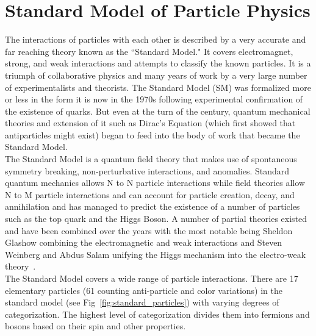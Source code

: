 	\section{Standard Model of Particle Physics}
	The interactions of particles with each other is described by a very accurate and far reaching theory known as the ``Standard Model." It covers electromagnet, strong, and weak  interactions and attempts to classify the known particles. It is a triumph of collaborative physics and many years of work by a very large number of experimentalists and theorists. The Standard Model (SM) was formalized more or less in the form it is now in the 1970s following experimental confirmation of the existence of quarks. But even at the turn of the century, quantum mechanical theories and extension of it such as Dirac's Equation (which first showed that antiparticles might exist) began to feed into the body of work that became the Standard Model.\\
	
	The Standard Model is a quantum field theory that makes use of spontaneous symmetry breaking, non-perturbative interactions, and anomalies.  Standard quantum mechanics allows N to N particle interactions while field theories allow N to M particle interactions and can account for particle creation, decay, and annihilation and has managed to predict the existence of a number of particles such as the top quark and the Higgs Boson. A number of partial theories existed and have been combined over the years with the most notable being Sheldon Glashow combining the electromagnetic and weak interactions and Steven Weinberg and Abdus Salam unifying the Higgs mechanism into the electro-weak theory~\cite{halzen}.\\
	
	The Standard Model covers a wide range of particle interactions. There are 17 elementary particles (61 counting anti-particle and color variations) in the standard model (see Fig~\ref{fig:standard_particles}) with varying degrees of categorization. The highest level of categorization divides them into fermions and bosons based on their spin and other properties.
	
